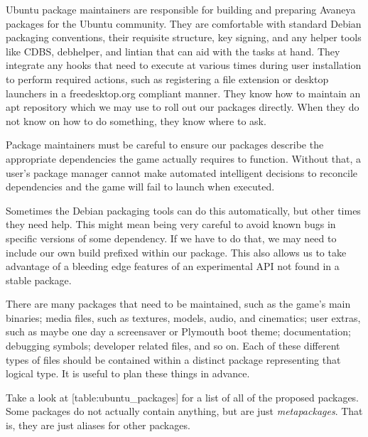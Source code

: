 
Ubuntu package maintainers are responsible for building and preparing Avaneya packages for the Ubuntu community. They are comfortable with standard Debian packaging conventions, their requisite structure, key signing, and any helper tools like CDBS, debhelper, and lintian that can aid with the tasks at hand. They integrate any hooks that need to execute at various times during user installation to perform required actions, such as registering a file extension or desktop launchers in a freedesktop.org compliant manner. They know how to maintain an apt repository which we may use to roll out our packages directly. When they do not know on how to do something, they know where to ask.

Package maintainers must be careful to ensure our packages describe the appropriate dependencies the game actually requires to function. Without that, a user's package manager cannot make automated intelligent decisions to reconcile dependencies and the game will fail to launch when executed. 

Sometimes the Debian packaging tools can do this automatically, but other times they need help. This might mean being very careful to avoid known bugs in specific versions of some dependency. If we have to do that, we may need to include our own build prefixed within our package. This also allows us to take advantage of a bleeding edge features of an experimental API not found in a stable package.

There are many packages that need to be maintained, such as the game's main binaries; media files, such as textures, models, audio, and cinematics; user extras, such as maybe one day a screensaver or Plymouth boot theme; documentation; debugging symbols; developer related files, and so on. Each of these different types of files should be contained within a distinct package representing that logical type. It is useful to plan these things in advance.

Take a look at [table:ubuntu_packages] for a list of all of the proposed packages. Some packages do not actually contain anything, but are just {\it metapackages}. That is, they are just aliases for other packages.
\crlf

